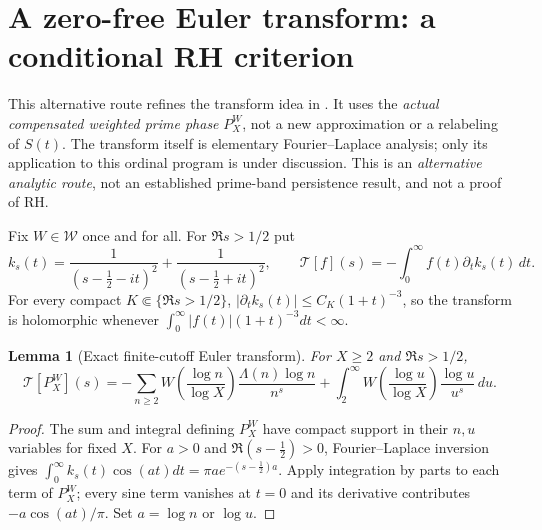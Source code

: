 \documentclass[11pt,a4paper]{article}
\numberwithin{equation}{section}
\newtheorem{lemma}[theorem]{Lemma}
\theoremstyle{definition}
\theoremstyle{remark}
\begin{document}
\section{A zero-free Euler transform: a conditional RH criterion}
\label{sec:v7-transform}
This alternative route refines the transform idea in
\cite{CasanaV10Notes}. It uses the \emph{actual compensated
weighted prime phase} $P_X^W$, not a new approximation or a
relabeling of $S(t)$. The transform itself is elementary
Fourier--Laplace analysis; only its application to this ordinal
program is under discussion. This is an \emph{alternative
analytic route}, not an established prime-band persistence
result, and not a proof of RH.

Fix $W\in\mathcal W$ once and for all. For $\Re s>1/2$ put
\begin{equation}\label{eq:v7-ks}
 k_s(t)=\frac1{(s-\frac12-it)^2}+
        \frac1{(s-\frac12+it)^2},\qquad
 \mathcal T[f](s)=-\int_0^\infty f(t)\partial_t k_s(t)\,dt.
\end{equation}
For every compact $K\Subset\{\Re s>1/2\}$,
$|\partial_t k_s(t)|\le C_K(1+t)^{-3}$,
so the transform is holomorphic whenever
$\int_0^\infty|f(t)|(1+t)^{-3}dt<\infty$.

\begin{lemma}[Exact finite-cutoff Euler transform]
\label{lem:v7-euler-transform}
For $X\ge2$ and $\Re s>1/2$,
\begin{equation}\label{eq:v7-euler-transform}
\mathcal T[P_X^W](s)
=-\sum_{n\ge2} W\!\left(\frac{\log n}{\log X}\right)
\frac{\Lambda(n)\log n}{n^s}
+\int_2^\infty W\!\left(\frac{\log u}{\log X}\right)
\frac{\log u}{u^s}\,du.
\end{equation}
\end{lemma}
\begin{proof}
The sum and integral defining $P_X^W$ have compact support
in their $n,u$ variables for fixed $X$. For $a>0$ and
$\Re(s-\frac12)>0$, Fourier--Laplace inversion gives
$\int_0^\infty k_s(t)\cos(at)dt=\pi a e^{-(s-\frac12)a}$.
Apply integration by parts to each term of $P_X^W$; every
sine term vanishes at $t=0$ and its derivative contributes
$-a\cos(at)/\pi$. Set $a=\log n$ or $\log u$.
\end{proof}
\end{document}
